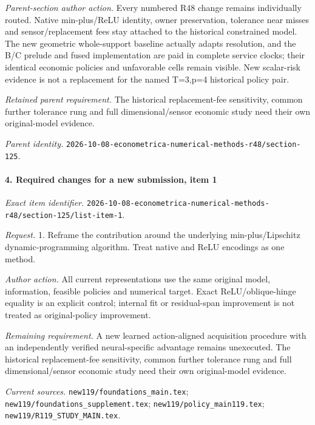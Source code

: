 \emph{Parent-section author action.} Every numbered R48 change remains individually routed. Native min-plus/\allowbreak{}ReLU identity, owner preservation, tolerance near misses and sensor/\allowbreak{}replacement fees stay attached to the historical constrained model. The new geometric whole-support baseline actually adapts resolution, and the B/\allowbreak{}C prelude and fused implementation are paid in complete service clocks; their identical economic policies and unfavorable cells remain visible. New scalar-risk evidence is not a replacement for the named T=3,p=4 historical policy pair.

\par\emph{Retained parent requirement.} The historical replacement-fee sensitivity, common further tolerance rung and full dimensional/\allowbreak{}sensor economic study need their own original-model evidence.

\par\emph{Parent identity.} \nolinkurl{2026-10-08-econometrica-numerical-methods-r48/section-125}.

\paragraph{4. Required changes for a new submission, item 1}

\emph{Exact item identifier.} \nolinkurl{2026-10-08-econometrica-numerical-methods-r48/section-125/list-item-1}.

\par\emph{Request.} 1. Reframe the contribution around the underlying min-plus/\allowbreak{}Lipschitz dynamic-programming algorithm. Treat native and ReLU encodings as one method.

\par\emph{Author action.} All current representations use the same original model, information, feasible policies and numerical target. Exact ReLU/\allowbreak{}oblique-hinge equality is an explicit control; internal fit or residual-span improvement is not treated as original-policy improvement.

\par\emph{Remaining requirement.} A new learned action-aligned acquisition procedure with an independently verified neural-specific advantage remains unexecuted. The historical replacement-fee sensitivity, common further tolerance rung and full dimensional/\allowbreak{}sensor economic study need their own original-model evidence.

\par\emph{Current sources.} \nolinkurl{new119/foundations_main.tex}; \nolinkurl{new119/foundations_supplement.tex}; \nolinkurl{new119/policy_main119.tex}; \nolinkurl{new119/R119_STUDY_MAIN.tex}.

